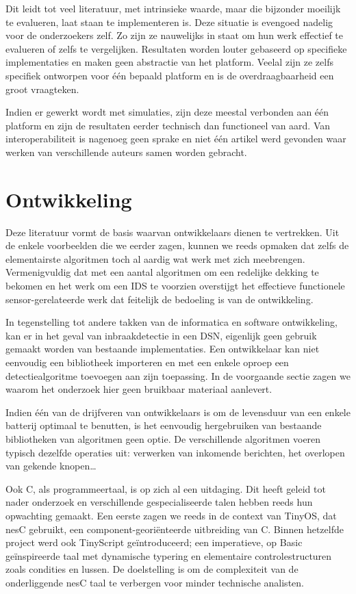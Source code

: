 Dit leidt tot veel literatuur, met intrinsieke waarde, maar die bijzonder
moeilijk te evalueren, laat staan te implementeren is. Deze situatie is
evengoed nadelig voor de onderzoekers zelf. Zo zijn ze nauwelijks in staat om
hun werk effectief te evalueren of zelfs te vergelijken. Resultaten worden
louter gebaseerd op specifieke implementaties en maken geen abstractie van het
platform. Veelal zijn ze zelfs specifiek ontworpen voor \'e\'en bepaald
platform en is de overdraagbaarheid een groot vraagteken.

Indien er gewerkt wordt met simulaties, zijn deze meestal verbonden aan \'e\'en
platform en zijn de resultaten eerder technisch dan functioneel van aard. Van
interoperabiliteit is nagenoeg geen sprake en niet \'e\'en artikel werd
gevonden waar werken van verschillende auteurs samen worden gebracht.

\section{Ontwikkeling}
\label{section:problem-develop}

Deze literatuur vormt de basis waarvan ontwikkelaars dienen te vertrekken. Uit
de enkele voorbeelden die we eerder zagen, kunnen we reeds opmaken dat zelfs de
elementairste algoritmen toch al aardig wat werk met zich meebrengen.
Vermenigvuldig dat met een aantal algoritmen om een redelijke dekking te
bekomen en het werk om een IDS te voorzien overstijgt het effectieve
functionele sensor-gerelateerde werk dat feitelijk de bedoeling is van de
ontwikkeling.

In tegenstelling tot andere takken van de informatica en software ontwikkeling,
kan er in het geval van inbraakdetectie in een DSN, eigenlijk geen gebruik
gemaakt worden van bestaande implementaties. Een ontwikkelaar kan niet
eenvoudig een bibliotheek importeren en met een enkele oproep een
detectiealgoritme toevoegen aan zijn toepassing. In de voorgaande sectie zagen
we waarom het onderzoek hier geen bruikbaar materiaal aanlevert.

Indien \'e\'en van de drijfveren van ontwikkelaars is om de levensduur van een
enkele batterij optimaal te benutten, is het eenvoudig hergebruiken van
bestaande bibliotheken van algoritmen geen optie. De verschillende algoritmen
voeren typisch dezelfde operaties uit: verwerken van inkomende berichten, het
overlopen van gekende knopen\dots

Ook C, als programmeertaal, is op zich al een uitdaging. Dit heeft geleid tot
nader onderzoek en verschillende gespecialiseerde talen hebben reeds hun
opwachting gemaakt. Een eerste zagen we reeds in de context van TinyOS, dat
nesC \citep{gay2003nesc} gebruikt, een component-geori\"enteerde uitbreiding
van C. Binnen hetzelfde project werd ook TinyScript \citep{levis2004tinyscript}
ge\"introduceerd; een imperatieve, op Basic ge\"inspireerde taal met dynamische
typering en elementaire controlestructuren zoals condities en lussen. De
doelstelling is om de complexiteit van de onderliggende nesC taal te verbergen
voor minder technische analisten.

